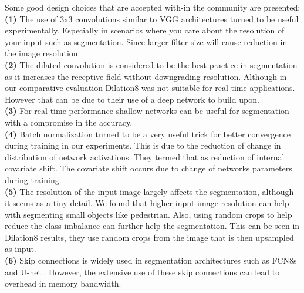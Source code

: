\documentclass[conference]{IEEEtran}
\begin{document}
Some good design choices that are accepted with-in the community are presented:\\
\textbf{(1)} The use of 3x3 convolutions similar to VGG architectures \cite{simonyan2014very} turned to be useful experimentally. Especially in scenarios where you care about the resolution of your input such as segmentation. Since larger filter size will cause reduction in the image resolution.\\
\textbf{(2)} The dilated convolution is considered to be the best practice in segmentation as it increases the receptive field without downgrading resolution. Although in our comparative evaluation Dilation8 was not suitable for real-time applications. However that can be due to their use of a deep network to build upon.\\
\textbf{(3)} For real-time performance shallow networks can be useful for segmentation with a compromise in the accuracy.\\
\textbf{(4)} Batch normalization \cite{ioffe2015batch} turned to be a very useful trick for better convergence during training in our experiments. This is due to the reduction of change in distribution of network activations. They termed that as reduction of internal covariate shift. The covariate shift occurs due to change of networks parameters during training.\\
\textbf{(5)} The resolution of the input image largely affects the segmentation, although it seems as a tiny detail. We found that higher input image resolution can help with segmenting small objects like pedestrian. Also, using random crops to help reduce the class imbalance can further help the segmentation. This can be seen in Dilation8 results, they use random crops from the image that is then upsampled as input.\\
\textbf{(6)} Skip connections is widely used in segmentation architectures such as FCN8s \cite{long2015fully} and U-net \cite{ronneberger2015u}. However, the extensive use of these skip connections can lead to overhead in memory bandwidth. \\

\end{document}
